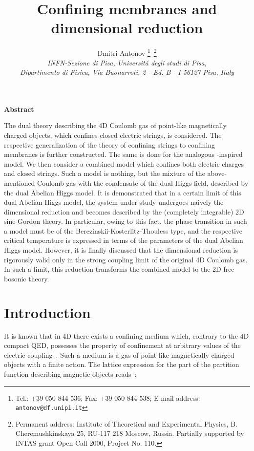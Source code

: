 \documentclass[a4paper,12pt]{article}
\title{\bf Confining membranes and dimensional reduction}
\author{Dmitri Antonov \thanks{Tel.: +39 050 844 536; Fax: +39 050 844 538; E-mail address: {\tt antonov@df.unipi.it}}{\,}
\thanks{Permanent address:
Institute of Theoretical and Experimental Physics, 
B. Cheremushkinskaya 25, RU-117 218 Moscow, Russia. Partially supported by INTAS grant Open Call 2000, Project No. 110.}
\\
{\it INFN-Sezione di Pisa, Universit\'a degli studi di Pisa,}\\
{\it Dipartimento di Fisica, Via Buonarroti, 2 - Ed. B - I-56127 Pisa, Italy}}
\date{}
\begin{document}
\maketitle
\vspace{1mm}
\centerline{\bf {Abstract}}
\vspace{3mm}
\noindent
The dual theory describing the 4D Coulomb gas of point-like magnetically charged objects, 
which confines closed electric strings, is considered. The respective generalization of the 
theory of confining strings to confining membranes is further constructed. The same is done for the 
analogous \coordHE{}-inspired model. We then consider a combined 
model which confines both electric charges and closed strings. Such a model is nothing, but 
the mixture of the above-mentioned Coulomb gas with the condensate of the dual Higgs field, described 
by the dual Abelian Higgs model. 
It is demonstrated that in a certain limit of this dual Abelian Higgs model, 
the system under study undergoes naively the dimensional
reduction and becomes described by the (completely integrable) 2D sine-Gordon theory. In particular,
owing to this fact, the phase transition in such a model must be of the Berezinskii-Kosterlitz-Thouless
type, and the respective critical temperature is expressed in terms of the parameters of the 
dual Abelian Higgs model. However, it is finally discussed that the dimensional reduction is 
rigorously valid only in the strong coupling limit of the original 4D Coulomb gas. In such a limit, this reduction 
transforms the combined model to the 2D free bosonic theory.





\newpage

\section{Introduction}

It is known that in 4D there exists a confining medium which, 
contrary to the 4D compact QED, possesses the property of confinement 
at arbitrary values of the electric coupling~\cite{1}. Such a medium is a gas of 
point-like magnetically charged objects with a finite action. The lattice expression 
for the part of the partition function describing magnetic objects reads~\cite{1}:
\end{document}
